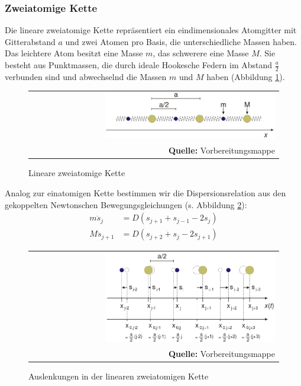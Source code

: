 \documentclass[a4paper,titlepage]{scrartcl}
\numberwithin{equation}{section}
\begin{document}
\subsubsection{Zweiatomige Kette}
Die lineare zweiatomige Kette repräsentiert ein eindimensionales Atomgitter mit Gitterabstand $a$ und zwei Atomen pro Basis, die unterschiedliche Massen haben. Das leichtere Atom besitzt eine Masse $m$, das schwerere eine Masse $M$. Sie besteht aus Punktmassen, die durch ideale Hookesche Federn im Abstand $\frac{a}{2}$ verbunden sind und abwechselnd die Massen $m$ und $M$ haben (Abbildung \ref{fig:zweiatomkette}).
\begin{figure}[H]
	\centering
	\begin{tabular}{@{}r@{}}
		\includegraphics[width=0.7\textwidth]{images/zweiatomkette.png}\\
		\footnotesize\sffamily\textbf{Quelle:} Vorbereitungsmappe \cite{vorbereitungsmappe}
	\end{tabular}
	\caption{Lineare zweiatomige Kette}
    \label{fig:zweiatomkette}
\end{figure}
Analog zur einatomigen Kette bestimmen wir die Dispersionsrelation aus den gekoppelten Newtonschen Bewegungsgleichungen (s. Abbildung \ref{fig:zweiatomkettekraft}):
\begin{align*}
m \ddot{s}_j&=D(s_{j+1} + s_{j-1} - 2s_j)\\
M \ddot{s}_{j+1}&=D(s_{j+2} + s_j - 2s_{j+1})
\end{align*}
\begin{figure}[H]
	\centering
	\begin{tabular}{@{}r@{}}
		\includegraphics[width=0.7\textwidth]{images/zweiatomkettekraft.png}\\
		\footnotesize\sffamily\textbf{Quelle:} Vorbereitungsmappe \cite{vorbereitungsmappe}
	\end{tabular}
	\caption{Auslenkungen in der linearen zweiatomigen Kette}
    \label{fig:zweiatomkettekraft}
\end{figure}
\end{document}
